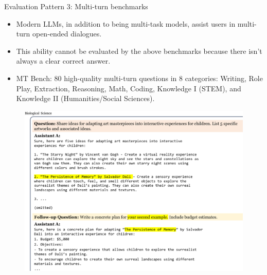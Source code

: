 \documentclass[handout]{beamer}
\begin{document}
\begin{frame}{Evaluation Pattern 3: Multi-turn benchmarks}
\begin{scriptsize}
\begin{itemize}
\item Modern LLMs, in addition to being multi-task models, assist users in multi-turn open-ended dialogues.
\item This ability cannot be evaluated by the above benchmarks because there isn't always a clear correct answer.
\item MT Bench: 80 high-quality multi-turn questions in 8 categories: Writing, Role Play, Extraction, Reasoning, Math, Coding, Knowledge I (STEM), and Knowledge II (Humanities/Social Sciences).
\end{itemize}

      \begin{figure}[h]
	\includegraphics[scale = 0.23]{pics/mtbenchex1.png}
\end{figure}


\end{scriptsize}
\end{frame}
\end{document}
